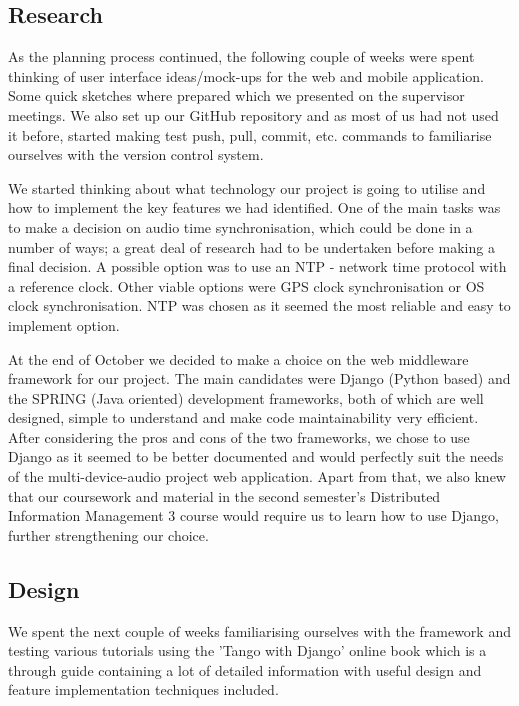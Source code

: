 \documentclass{l3proj}
\begin{document}
\subsection{Research}

As the planning process continued, the following couple of weeks were spent thinking of user interface ideas/mock-ups for the web and mobile application. Some quick sketches where prepared which we presented on the supervisor meetings. We also set up our GitHub repository and as most of us had not used it before, started making test push, pull, commit, etc. commands to familiarise ourselves with the version control system.

We started thinking about what technology our project is going to utilise and how to implement the key features we had identified. One of the main tasks was to make a decision on audio time synchronisation, which could be done in a number of ways; a great deal of research had to be undertaken before making a final decision. A possible option was to use an NTP - network time protocol with a reference clock. Other viable options were GPS clock synchronisation or OS clock synchronisation. NTP was chosen as it seemed the most reliable and easy to implement option.

At the end of October we decided to make a choice on the web middleware framework for our project. The main candidates were Django (Python based) and the SPRING (Java oriented) development frameworks, both of which are well designed, simple to understand and make code maintainability very efficient. After considering the pros and cons of the two frameworks, we chose to use Django as it seemed to be better documented and would perfectly suit the needs of the multi-device-audio project web application. Apart from that, we also knew that our coursework and material in the second semester's Distributed Information Management 3 course would require us to learn how to use Django, further strengthening our choice.

\subsection{Design}

We spent the next couple of weeks familiarising ourselves with the framework and testing various tutorials using the 'Tango with Django' online book which is a through guide containing a lot of detailed information with useful design and feature implementation techniques included.
\end{document}
